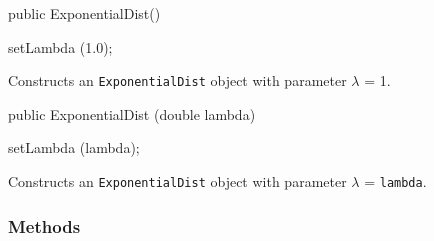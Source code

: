 \begin{code}

   public ExponentialDist()\begin{hide} {
      setLambda (1.0);
   }\end{hide}
\end{code}
  \begin{tabb} Constructs an \texttt{ExponentialDist} object with parameter $\lambda$ = 1.
  \end{tabb}
\begin{code}

   public ExponentialDist (double lambda)\begin{hide} {
      setLambda (lambda);
  }\end{hide}
\end{code}
 \begin{tabb} Constructs an \texttt{ExponentialDist} object with parameter $\lambda$ =
  \texttt{lambda}.
 \end{tabb}

\subsubsection* {Methods}

